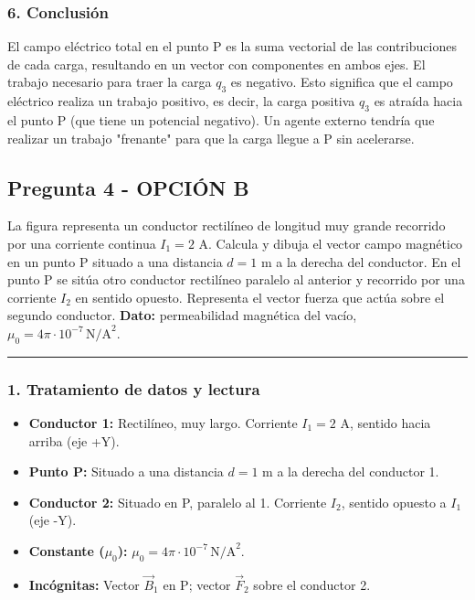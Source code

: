 \subsubsection*{6. Conclusión}
\begin{cajaconclusion}
El campo eléctrico total en el punto P es la suma vectorial de las contribuciones de cada carga, resultando en un vector con componentes en ambos ejes. El trabajo necesario para traer la carga $q_3$ es negativo. Esto significa que el campo eléctrico realiza un trabajo positivo, es decir, la carga positiva $q_3$ es atraída hacia el punto P (que tiene un potencial negativo). Un agente externo tendría que realizar un trabajo "frenante" para que la carga llegue a P sin acelerarse.
\end{cajaconclusion}

\newpage

\subsection{Pregunta 4 - OPCIÓN B}
\label{subsec:4B_2018_jun_ord}
\begin{cajaenunciado}
La figura representa un conductor rectilíneo de longitud muy grande recorrido por una corriente continua $I_{1}=2$ A. Calcula y dibuja el vector campo magnético en un punto P situado a una distancia $d=1$ m a la derecha del conductor. En el punto P se sitúa otro conductor rectilíneo paralelo al anterior y recorrido por una corriente $I_{2}$ en sentido opuesto. Representa el vector fuerza que actúa sobre el segundo conductor.
\textbf{Dato:} permeabilidad magnética del vacío, $\mu_{0}=4\pi\cdot10^{-7}\,\text{N/A}^2$.
\end{cajaenunciado}
\hrule

\subsubsection*{1. Tratamiento de datos y lectura}
\begin{itemize}
    \item \textbf{Conductor 1:} Rectilíneo, muy largo. Corriente $I_1 = 2$ A, sentido hacia arriba (eje +Y).
    \item \textbf{Punto P:} Situado a una distancia $d=1$ m a la derecha del conductor 1.
    \item \textbf{Conductor 2:} Situado en P, paralelo al 1. Corriente $I_2$, sentido opuesto a $I_1$ (eje -Y).
    \item \textbf{Constante ($\mu_0$):} $\mu_0 = 4\pi\cdot10^{-7} \, \text{N/A}^2$.
    \item \textbf{Incógnitas:} Vector $\vec{B}_1$ en P; vector $\vec{F}_2$ sobre el conductor 2.
\end{itemize}

